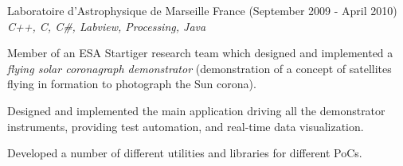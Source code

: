 \documentclass[alan.tex]{subfiles}
\begin{document}
  \item[Laboratoire d'Astrophysique de Marseille] France (September 2009 - April 2010)\\
  \emph{C++, C, C\#, Labview, Processing, Java}
  \begin{my_contractor}
  Member of an ESA Startiger research team which designed and implemented a \emph{flying solar coronagraph demonstrator} (demonstration of a concept of satellites flying in formation to photograph the Sun corona).
    \begin{my_bullets}
      \item Designed and implemented the main application driving all the demonstrator instruments, providing test automation, and real-time data visualization.
      \item Developed a number of different utilities and libraries for different PoCs.
    \end{my_bullets}
  \end{my_contractor}
\end{document}
